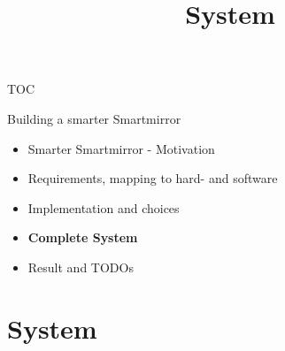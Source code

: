 \documentclass[xcolor=svgnames,handout,aspectratio=169]{beamer}
\begin{document}
\begin{frame}
  {TOC}

  Building a smarter Smartmirror

  \begin{itemize}
  \item Smarter Smartmirror - Motivation
  \item Requirements, mapping to hard- and software
  \item Implementation and choices
  \item \textbf{Complete System}
  \item Result and TODOs
  \end{itemize}
\end{frame}

\section{System}
\title[System]{System}
\end{document}
